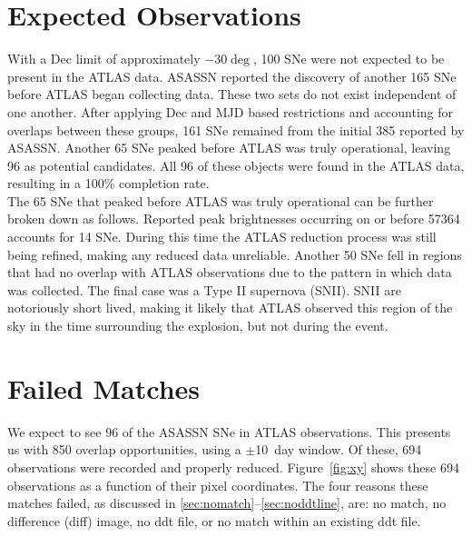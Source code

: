 \section{Expected Observations}\label{sec:expobs}

\indent With a Dec limit of approximately $-30\deg$, 100 SNe were not 
expected to be present in the ATLAS data.  
ASASSN reported the discovery of another 165 SNe before ATLAS began collecting data. 
These two sets do not exist independent of one another. 
After applying Dec and MJD based restrictions and accounting for overlaps between 
these groups, 161 SNe remained from the initial 385 reported by ASASSN. 
Another 65 SNe peaked before ATLAS was truly operational, leaving 96 as potential candidates.  
All 96 of these objects were found in the ATLAS data, resulting in a 100\% completion rate.\\
%
\indent The 65 SNe that peaked before ATLAS was truly operational can be further broken down as follows.  
Reported peak brightnesses occurring on or before 57364 accounts for 14 SNe.  
During this time the ATLAS reduction process was still being refined, making 
any reduced data unreliable.  
Another 50 SNe fell in regions that had no overlap with ATLAS observations due 
to the pattern in which data was collected.  
The final case was a Type II supernova (SNII).  
SNII are notoriously short lived, making it likely that ATLAS observed this region of the sky in the 
time surrounding the explosion, but not during the event.


\section{Failed Matches}\label{sec:failmatch}

We expect to see 96 of the ASASSN SNe in ATLAS observations. 
This presents us with 850 overlap opportunities, using a 
$\pm$10~day window.  Of these, 694 observations were recorded 
and properly reduced.  
Figure~\ref{fig:xy} shows these 694 observations as a function of their 
pixel coordinates.  
The four reasons these matches failed, as discussed in 
\cref{sec:nomatch}--\cref{sec:noddtline}, are: no match, no difference (diff) 
image, no ddt file, or no match within an existing ddt file.

